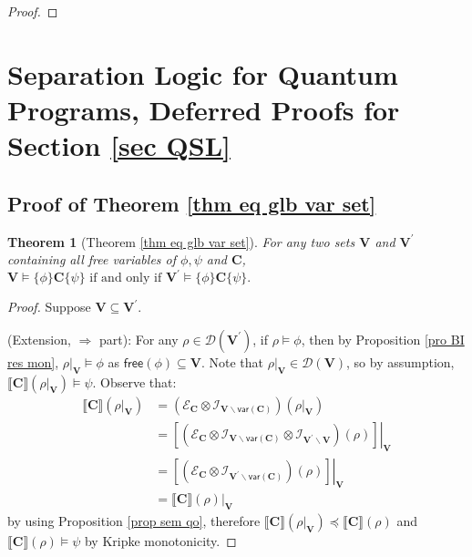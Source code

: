 \documentclass[conference,compsoc, 10pt]{IEEEtran}
\newtheorem{theorem}{Theorem}[section]
\newcommand {\cD } {{\mathcal{D}}}
\newcommand {\cE } {{\mathcal{E}}}
\newcommand {\cI } {{\mathcal{I}}}
\newcommand {\free }[1] {{\mathsf{free}\left(#1\right)}}
\newcommand {\rt }[2] {{\left.{#1}\right|_{#2}}}
\newcommand {\vars } {\mathbf{V}}
\newcommand {\var } {\mathsf{var}}
\newcommand {\prog } {{\mathbf{C}}}
\newcommand {\sem}[1] {\llbracket#1\rrbracket}
\begin{document}
\begin{appendices}
\begin{proof}
		\end{proof}
		
		
		\section{Separation Logic for Quantum Programs, Deferred Proofs for Section \ref{sec QSL}}
		\label{sec app QSL}
		
		\subsection{Proof of Theorem \ref{thm eq glb var set}}
		
		\begin{theorem}[Theorem \ref{thm eq glb var set}]
			For any two sets $\vars$ and $\vars^\prime$ containing all free variables of $\phi, \psi$ and $\prog$,
			$\vars\models\{\phi\}\prog\{\psi\} \text{\ if\ and\ only\ if\ }\vars^\prime\models\{\phi\}\prog\{\psi\}.$
		\end{theorem}
		
		\begin{proof} Suppose $\vars\subseteq \vars^\prime$.
			
			(Extension, $\Rightarrow$ part): For any $\rho\in\cD(\vars^\prime)$, if $\rho\models\phi$, then by Proposition \ref{pro BI res mon}, $\rt{\rho}{\vars}\models\phi$ as $\free{\phi}\subseteq\vars$.
			Note that $\rt{\rho}{\vars}\in\cD(\vars)$, so by assumption, 
			$\sem{\prog}(\rt{\rho}{\vars})\models\psi$. Observe that:
			\begin{align*}
			\sem{\prog}(\rt{\rho}{\vars}) &= 
			(\cE_\prog\otimes\cI_{\vars\backslash\var(\prog)})(\rt{\rho}{\vars}) \\
			&= \rt{\left[(\cE_\prog\otimes\cI_{\vars\backslash\var(\prog)}\otimes\cI_{\vars^\prime\backslash\vars})(\rho)\right]}{\vars} \\
			&= \rt{\left[(\cE_\prog\otimes\cI_{\vars^\prime\backslash\var(\prog)})(\rho)\right]}{\vars} \\
			&= \rt{\sem{\prog}(\rho)}{\vars}
			\end{align*}
			by using Proposition \ref{prop sem qo}, therefore $\sem{\prog}(\rt{\rho}{\vars})\preceq\sem{\prog}(\rho)$ and $\sem{\prog}(\rho)\models\psi$ by Kripke monotonicity.
			

\end{proof}
\end{appendices}
\end{document}
